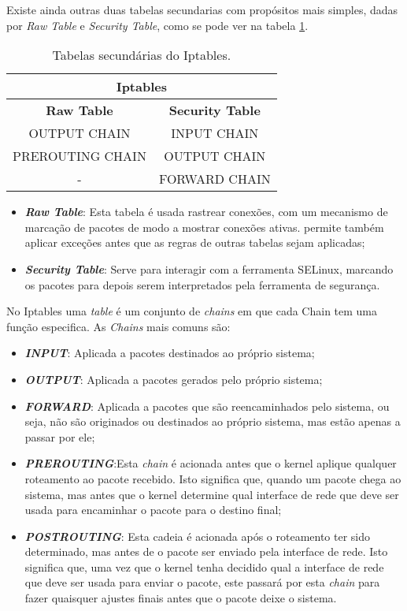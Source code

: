Existe ainda outras duas tabelas secundarias com propósitos mais simples, dadas 
por \textit{Raw Table} e \textit{Security Table}, como se pode ver na
tabela \ref{ipt2}.


\begin{table}[h]
\centering
\begin{tabular}{|c|c|}
\hline
\multicolumn{2}{|c|}{Iptables}\\
\hline
\rowcolor{yellow!50}\textbf{Raw Table} & \textbf{Security Table}\\
\hline
OUTPUT CHAIN & INPUT CHAIN \\
\hline
PREROUTING CHAIN & OUTPUT CHAIN \\
\hline
- & FORWARD CHAIN \\
\hline
\end{tabular}
\caption{Tabelas secundárias do Iptables.}
\label{ipt2}
\end{table}
    

\begin{itemize}
\item \textbf{\textit{Raw Table}}: Esta tabela é usada rastrear conexões, com um mecanismo de
marcação de pacotes de modo a mostrar conexões ativas. permite também aplicar
exceções antes que as regras de outras tabelas sejam aplicadas;
\item \textbf{\textit{Security Table}}: Serve para interagir com a ferramenta SELinux, marcando
os pacotes para depois serem interpretados pela ferramenta de segurança.
\end{itemize}



No Iptables uma \textit{table} é um conjunto de \textit{chains} em que cada Chain tem uma função
especifica. As \textit{Chains} mais comuns são:

\begin{itemize}
\item \textbf{\textit{INPUT}}: Aplicada a pacotes destinados ao próprio sistema;
\item \textbf{\textit{OUTPUT}}: Aplicada a pacotes gerados pelo próprio sistema;
\item \textbf{\textit{FORWARD}}: Aplicada a pacotes que são reencaminhados pelo sistema,
ou seja, não são originados ou destinados ao próprio sistema, mas estão apenas a passar
por ele;
\item \textbf{\textit{PREROUTING}}:Esta \textit{chain} é acionada antes que o kernel 
aplique qualquer roteamento ao pacote recebido. Isto significa que, quando um pacote 
chega ao sistema, mas antes que o kernel determine qual interface de rede que deve ser 
usada para encaminhar o pacote para o destino final;
\item \textbf{\textit{POSTROUTING}}: Esta cadeia é acionada após o roteamento 
ter sido determinado, mas antes de o pacote ser enviado pela interface de rede.
Isto significa que, uma vez que o kernel tenha decidido qual a interface de rede que
deve ser usada para enviar o pacote, este passará por esta \textit{chain} para fazer 
quaisquer ajustes finais antes que o pacote deixe o sistema.
\end{itemize}

